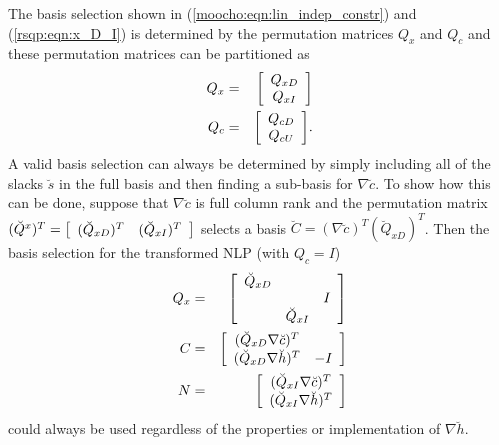 \documentclass[pdf,ps2pdf,11pt]{SANDreport}
\begin{document}
{{The basis selection shown in (\ref{moocho:eqn:lin_indep_constr}) and
(\ref{rsqp:eqn:x_D_I}) is determined by the permutation matrices $Q_x$ and
$Q_c$ and these permutation matrices can be partitioned as
%
\begin{eqnarray}
Q_{x} & = & {\bmat{c} Q_{xD} \\ Q_{xI} \emat} \label{moocho:eqn:Qx} \\
Q_{c} & = & {\bmat{c} Q_{cD} \\ Q_{cU} \emat} \label{moocho:eqn:Qc}.
\end{eqnarray}
%
A valid basis selection can always be determined by simply including all of
the slacks $\breve{s}$ in the full basis and then finding a sub-basis for
$\nabla \breve{c}$.  To show how this can be done, suppose that $\nabla
\breve{c}$ is full column rank and the permutation matrix $(\breve{Q}^x)^T =
{\bmat{cc} (\breve{Q}_{xD})^T & (\breve{Q}_{xI})^T \emat}$ selects a basis
$\breve{C} = (\nabla \breve{c})^T (\breve{Q}_{xD})^T$.  Then the basis
selection for the transformed NLP (with $Q_c = I$)
%
\begin{eqnarray}
Q_x & = & {\bmat{ccc}
 \breve{Q}_{xD}  &                &     \\
                 &                & I   \\
                 & \breve{Q}_{xI} &
\emat} \\
C & = & {\bmat{cc} ( \breve{Q}_{xD} \nabla \breve{c} )^T \\ ( \breve{Q}_{xD} \nabla \breve{h} )^T & -I \emat}
	\label{moocho:eqn:C_with_slacks} \\
N & = & {\bmat{c} ( \breve{Q}_{xI} \nabla \breve{c} )^T \\ ( \breve{Q}_{xI} \nabla \breve{h} )^T \emat}
\end{eqnarray}
%
could always be used regardless of the properties or implementation of $\nabla
\breve{h}$.

}}
\end{document}
